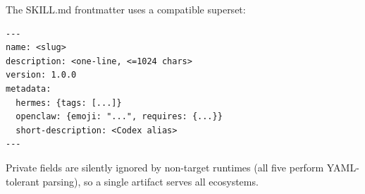 \documentclass[11pt]{article}
\begin{document}
The SKILL.md frontmatter uses a compatible superset:
\begin{verbatim}
---
name: <slug>
description: <one-line, <=1024 chars>
version: 1.0.0
metadata:
  hermes: {tags: [...]}
  openclaw: {emoji: "...", requires: {...}}
  short-description: <Codex alias>
---
\end{verbatim}
Private fields are silently ignored by non-target runtimes (all five perform YAML-tolerant parsing), so a single artifact serves all ecosystems.
\end{document}

